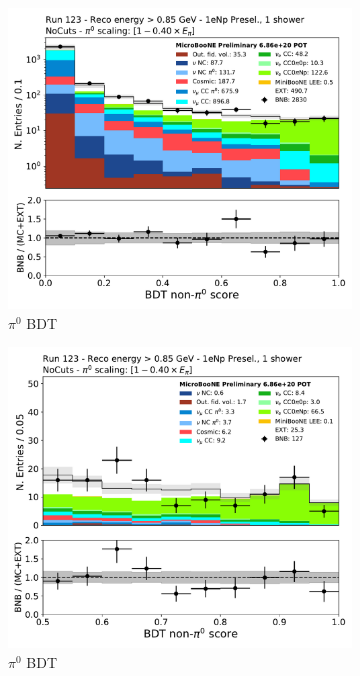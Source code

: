 \begin{figure}[H]
    \centering
    \begin{subfigure}{0.4\textwidth}
    \includegraphics[width=1.0\textwidth]{Sidebands/Figures/1eNp/HighEnergy/HiEext_NPOneShr_None_pi0e040/nonpi0_score_log.pdf}
    \caption{$\pi^0$ BDT}
    \end{subfigure}
    \begin{subfigure}{0.4\textwidth}
    \includegraphics[width=1.0\textwidth]{Sidebands/Figures/1eNp/HighEnergy/HiEext_NPOneShr_None_pi0e040/nonpi0_score_high_bdt.pdf}
    \caption{$\pi^0$ BDT}
    \end{subfigure}
    \caption{} 
    \label{fig:HE_1eNp_7}
\end{figure}

